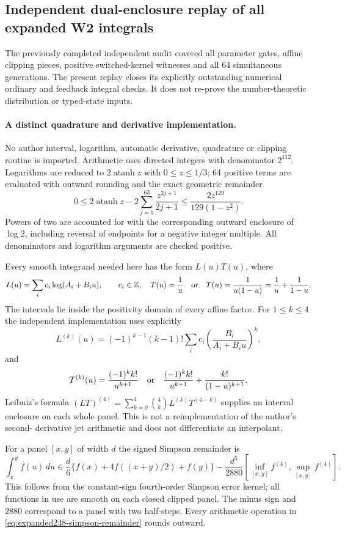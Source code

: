 \subsection{Independent dual-enclosure replay of all expanded W2 integrals}
\label{sec:expanded248-independent-integral-replay}
The previously completed independent audit covered all parameter gates,
affine clipping pieces, positive switched-kernel witnesses and all 64
simultaneous generations.  The present replay closes its explicitly
outstanding numerical ordinary and feedback integral checks.  It does
not re-prove the number-theoretic distribution or typed-state inputs.

\paragraph{A distinct quadrature and derivative implementation.}
No author interval, logarithm, automatic derivative, quadrature or
clipping routine is imported.  Arithmetic uses directed integers with
denominator $2^{112}$.  Logarithms are reduced to $2\operatorname{atanh}z$
with $0\le z\le1/3$; 64 positive terms are evaluated with outward
rounding and the exact geometric remainder
\[
 0\le 2\operatorname{atanh}z-
 2\sum_{j=0}^{63}\frac{z^{2j+1}}{2j+1}
 \le\frac{2z^{129}}{129(1-z^2)}.
\]
Powers of two are accounted for with the corresponding outward
enclosure of $\log2$, including reversal of endpoints for a negative
integer multiple.  All denominators and logarithm arguments are
checked positive.

Every smooth integrand needed here has the form $L(u)T(u)$, where
\[
 L(u)=\sum_i c_i\log(A_i+B_i u),\qquad c_i\in\mathbb Z,
 \quad T(u)=\frac1u\quad\hbox{or}\quad
 T(u)=\frac1{u(1-u)}=\frac1u+\frac1{1-u}.
\]
The intervals lie inside the positivity domain of every affine factor.
For $1\le k\le4$ the independent implementation uses explicitly
\[
 L^{(k)}(u)=(-1)^{k-1}(k-1)!
 \sum_i c_i\left(\frac{B_i}{A_i+B_i u}\right)^k,
\]
and
\[
 T^{(k)}(u)=\frac{(-1)^k k!}{u^{k+1}}
 \quad\hbox{or}\quad
 \frac{(-1)^k k!}{u^{k+1}}+\frac{k!}{(1-u)^{k+1}}.
\]
Leibniz's formula $ (LT)^{(4)}=\sum_{k=0}^4
\binom4kL^{(k)}T^{(4-k)}$ supplies an interval enclosure on each
whole panel.  This is not a reimplementation of the author's second-
derivative jet arithmetic and does not differentiate an interpolant.

For a panel $[x,y]$ of width $d$ the signed Simpson remainder is
\begin{equation}\label{eq:expanded248-simpson-remainder}
 \int_x^y f(u)\,du\in
 \frac d6\{f(x)+4f((x+y)/2)+f(y)\}
 -\frac{d^5}{2880}[\inf_{[x,y]}f^{(4)},\sup_{[x,y]}f^{(4)}].
\end{equation}
This follows from the constant-sign fourth-order Simpson error kernel;
all functions in use are smooth on each closed clipped panel.  The
minus sign and $2880$ correspond to a panel with two half-steps.
Every arithmetic operation in \eqref{eq:expanded248-simpson-remainder}
rounds outward.

